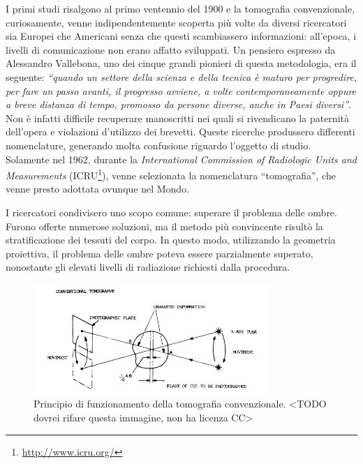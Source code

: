 \documentclass[a4paper,12pt, doubleside]{report}
\begin{document}
                \bigskip            
                \par
                    I primi studi risalgono al primo ventennio del 1900 e la tomografia convenzionale, curiosamente, venne indipendentemente scoperta più volte da diversi ricercatori sia Europei che Americani senza che questi scambiassero informazioni: all'epoca, i livelli di comunicazione non erano affatto sviluppati. Un pensiero espresso da Alessandro Vallebona, uno dei cinque grandi pionieri di questa metodologia, era il seguente: \textit{“quando un settore della scienza e della tecnica è maturo per progredire, per fare un passo avanti, il progresso avviene, a volte contemporaneamente oppure a breve distanza di tempo, promosso da persone diverse, anche in Paesi diversi”}\cite{vallebona-pensiero}.
                    Non è infatti difficile recuperare manoscritti nei quali si rivendicano la paternità dell'opera e violazioni d'utilizzo dei brevetti\cite{vallebona-difesa}. Queste ricerche produssero differenti nomenclature, generando molta confusione riguardo l'oggetto di studio. Solamente nel 1962, durante la \textit{International Commission of Radiologic Units and Measurements} (ICRU\footnote{\url{http://www.icru.org/}}), venne selezionata la nomenclatura “tomografia”, che venne presto adottata ovunque nel Mondo.
                            
                \bigskip
                \par
                    I ricercatori condivisero uno scopo comune: superare il problema delle ombre. Furono offerte numerose soluzioni, ma il metodo più convincente risultò la stratificazione dei tessuti del corpo. In questo modo, utilizzando la geometria proiettiva, il problema delle ombre poteva essere parzialmente superato, nonostante gli elevati livelli di radiazione richiesti dalla procedura.
                            
                    \begin{figure}[h]
                        \centering
                        \includegraphics[width=0.8\textwidth]{conventional}
                        \caption{Principio di funzionamento della tomografia convenzionale. <TODO dovrei rifare questa immagine, non ha licenza CC>}
                        \label{fig:conventional}
                    \end{figure}
                            
\end{document}
